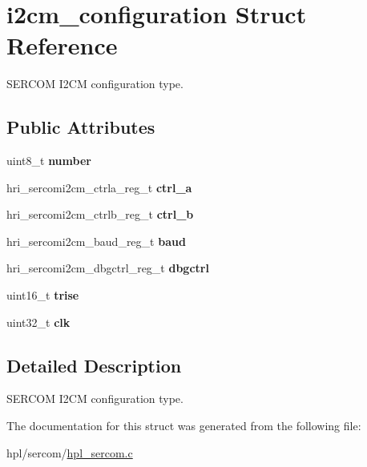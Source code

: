 \hypertarget{structi2cm__configuration}{}\section{i2cm\+\_\+configuration Struct Reference}
\label{structi2cm__configuration}


S\+E\+R\+C\+OM I2\+CM configuration type.  


\subsection*{Public Attributes}
\begin{DoxyCompactItemize}
\item 
\mbox{\label{structi2cm__configuration_a2dc21ca96bf98738a4e180d5e69a15d3}} 
uint8\+\_\+t {\bfseries number}
\item 
\mbox{\label{structi2cm__configuration_aba58659d55a511ca301acb611842f4ee}} 
hri\+\_\+sercomi2cm\+\_\+ctrla\+\_\+reg\+\_\+t {\bfseries ctrl\+\_\+a}
\item 
\mbox{\label{structi2cm__configuration_a9cae97ee9bbd8989f4fe1ed527181edc}} 
hri\+\_\+sercomi2cm\+\_\+ctrlb\+\_\+reg\+\_\+t {\bfseries ctrl\+\_\+b}
\item 
\mbox{\label{structi2cm__configuration_a6c24411d0106b5f21f7b21b0d68fce38}} 
hri\+\_\+sercomi2cm\+\_\+baud\+\_\+reg\+\_\+t {\bfseries baud}
\item 
\mbox{\label{structi2cm__configuration_aee02f025c856ccd9b9fb437e46c9c2e4}} 
hri\+\_\+sercomi2cm\+\_\+dbgctrl\+\_\+reg\+\_\+t {\bfseries dbgctrl}
\item 
\mbox{\label{structi2cm__configuration_a1eb99593b00af065c0396716b7f43978}} 
uint16\+\_\+t {\bfseries trise}
\item 
\mbox{\label{structi2cm__configuration_a0b27e80bb91d5eebd5e402e25a7d2372}} 
uint32\+\_\+t {\bfseries clk}
\end{DoxyCompactItemize}


\subsection{Detailed Description}
S\+E\+R\+C\+OM I2\+CM configuration type. 

The documentation for this struct was generated from the following file\+:\begin{DoxyCompactItemize}
\item 
hpl/sercom/\hyperlink{hpl__sercom_8c}{hpl\+\_\+sercom.\+c}\end{DoxyCompactItemize}
